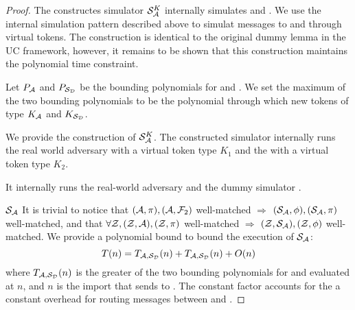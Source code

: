 \begin{proof}
The constructes simulator $\mathcal{S}_\mathcal{A}^K$ internally simulates \Dummysim and \Adversary. 
We use the internal simulation pattern described above to simulat messages to \Dummysim and \Adversary through virtual tokens.
The construction is identical to the original dummy lemma in the UC framework, however, it remains to be shown that this construction maintains the polynomial time constraint.

Let $P_\mathcal{A}$ and $P_{\mathcal{S}_{\mathcal{D}}}$ be the bounding polynomials for \Adversary and \Dummysim.
We set the maximum of the two bounding polynomials to be the polynomial through which new tokens of type $K_\mathcal{A}$ and $K_{\mathcal{S}_{\mathcal{D}}}$. 

We provide the construction of $\mathcal{S}_\mathcal{A}^K$.
The constructed simulator internally runs the real world adversary \Adversary with a virtual token type $K_1$ and the \Dummysim with a virtual token type $K_2$.

It internally runs the real-world adversary \Adversary and the dummy simulator \Dummysim. 

$\mathcal{S}_\mathcal{A}$ 
It is trivial to notice that $(\mathcal{A}, \pi), (\mathcal{A}, \mathcal{F}_2)$ well-matched $\Rightarrow$ $(\mathcal{S}_\mathcal{A}, \phi), (\mathcal{S}_\mathcal{A}, \pi)$ well-matched, and that $\forall \mathcal{Z}, (\mathcal{Z}, \mathcal{A}), (\mathcal{Z}, \pi)$ well-matched $\Rightarrow$ $(\mathcal{Z}, \mathcal{S}_\mathcal{A}), (\mathcal{Z}, \phi)$ well-matched.
We provide a polynomial bound to bound the execution of $\mathcal{S}_\mathcal{A}$:
\[
T(n) = T_{\mathcal{A},\mathcal{S}_{\mathcal{D}}}(n) + T_{\mathcal{A},\mathcal{S}_{\mathcal{D}}}(n) + O(n)
\]
where $T_{\mathcal{A},\mathcal{S}_{\mathcal{D}}}(n)$ is the greater of the two bounding polynomials for \Dummysim and \Adversary evaluated at $n$, and $n$ is the import that \Environment sends to \Adversary. 
The constant factor accounts for the a constant overhead for routing messages between \Dummysim and \Adversary.




\end{proof}

